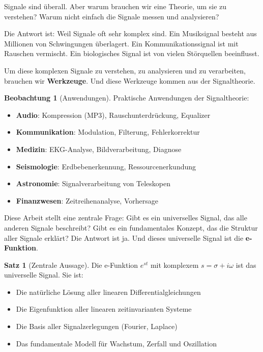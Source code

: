 ﻿\documentclass[a4paper,12pt]{report}
\theoremstyle{definition}
\newtheorem{satz}{Satz}
\newtheorem{beobachtung}{Beobachtung}
\begin{document}
	Signale sind überall. Aber warum brauchen wir eine Theorie, um sie zu verstehen? Warum nicht einfach die Signale messen und analysieren?
	
	Die Antwort ist: Weil Signale oft sehr komplex sind. Ein Musiksignal besteht aus Millionen von Schwingungen überlagert. Ein Kommunikationssignal ist mit Rauschen vermischt. Ein biologisches Signal ist von vielen Störquellen beeinflusst.
	
	Um diese komplexen Signale zu verstehen, zu analysieren und zu verarbeiten, brauchen wir \textbf{Werkzeuge}. Und diese Werkzeuge kommen aus der Signaltheorie.
	
	\begin{beobachtung}[Anwendungen]
		Praktische Anwendungen der Signaltheorie:
		\begin{itemize}
			\item[-] \textbf{Audio}: Kompression (MP3), Rauschunterdrückung, Equalizer
			\item[-] \textbf{Kommunikation}: Modulation, Filterung, Fehlerkorrektur
			\item[-] \textbf{Medizin}: EKG-Analyse, Bildverarbeitung, Diagnose
			\item[-] \textbf{Seismologie}: Erdbebenerkennung, Ressourcenerkundung
			\item[-] \textbf{Astronomie}: Signalverarbeitung von Teleskopen
			\item[-] \textbf{Finanzwesen}: Zeitreihenanalyse, Vorhersage
		\end{itemize}
	\end{beobachtung}
	
	Diese Arbeit stellt eine zentrale Frage: Gibt es ein universelles Signal, das alle anderen Signale beschreibt? Gibt es ein fundamentales Konzept, das die Struktur aller Signale erklärt? Die Antwort ist ja. Und dieses universelle Signal ist die \textbf{e-Funktion}.
	
	\begin{satz}[Zentrale Aussage]
		Die e-Funktion $e^{st}$ mit komplexem $s = \sigma + i\omega$ ist das universelle Signal. Sie ist:
		\begin{itemize}
			\item[-] Die natürliche Lösung aller linearen Differentialgleichungen
			\item[-] Die Eigenfunktion aller linearen zeitinvarianten Systeme
			\item[-] Die Basis aller Signalzerlegungen (Fourier, Laplace)
			\item[-] Das fundamentale Modell für Wachstum, Zerfall und Oszillation
		\end{itemize}
	\end{satz}
	
\end{document}
